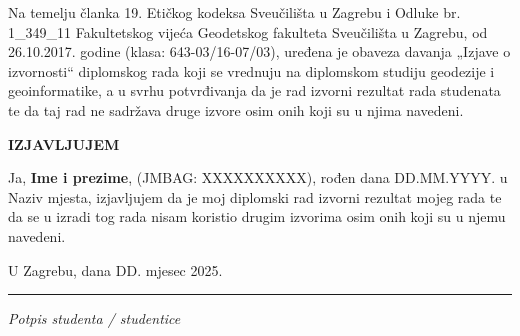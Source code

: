 \documentclass[12pt, oneside, a4paper, hidelinks]{report}
\newcommand{\myauthor}{Ime i prezime}
\begin{document}
	\noindent
	Na temelju članka 19. Etičkog kodeksa Sveučilišta u Zagrebu i Odluke br. 1\_349\_11 Fakultetskog vijeća Geodetskog fakulteta Sveučilišta u Zagrebu, od 26.10.2017. godine (klasa: 643-03/16-07/03), uređena je obaveza davanja „Izjave o izvornosti“ diplomskog rada koji se vrednuju na diplomskom studiju geodezije i geoinformatike, a u svrhu potvrđivanja da je rad izvorni rezultat rada studenata te da taj rad ne sadržava druge izvore osim onih koji su u njima navedeni.
	\vspace{.5in}
	
	\begin{center}
		\large\textbf{\MakeUppercase{izjavljujem}}\\
	\end{center}
	\vspace{.5in}
	
	\noindent
	Ja, \textbf{\myauthor}, (JMBAG: XXXXXXXXXX), rođen dana DD.MM.YYYY. u Naziv mjesta, izjavljujem da je moj diplomski rad izvorni rezultat mojeg rada te da se u izradi tog rada nisam koristio drugim izvorima osim onih koji su u njemu navedeni.
	\vspace{.8in}
	
	\noindent
	U Zagrebu, dana DD. mjesec 2025. \hfill \rule{2in}{.4pt}
	\begin{flushright}
		\textit{Potpis studenta / studentice}
	\end{flushright}
	
\end{document}
